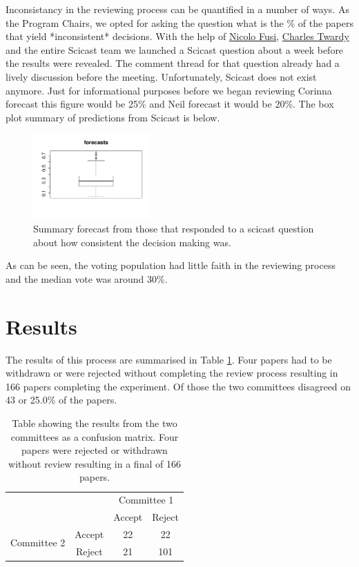 \documentclass[twoside]{article}
\begin{document}
Inconsistancy in the reviewing process can be quantified in a number
of ways. As the Program Chairs, we opted for asking the question what is the
\% of the papers that yield *inconsistent* decisions.
With the help of \href{http://nicolofusi.com/}{Nicolo Fusi},
\href{https://www.linkedin.com/in/ctwardy/}{Charles Twardy} and
the entire Scicast team we launched a
Scicast question about a week before the results were revealed.  The comment
thread for that question already had a lively discussion before the
meeting. Unfortunately, Scicast does not exist anymore. Just for informational
purposes before we began reviewing Corinna forecast this figure would be
25\% and Neil forecast it would be 20\%. The box plot summary of
predictions from Scicast is below.

\begin{figure}[htb]
\begin{center}
\includegraphics[width=0.40\textwidth]{diagrams/neurips/scicast-forecast.png}
\end{center}
\caption{Summary forecast from those that responded to a scicast question about how consistent the decision making was.}
\label{scicast-forecast}
\end{figure}

As can be seen, the voting population had little faith in the
reviewing process and the median vote was around 30\%.

\section{Results}

The results of this process are summarised in Table
\ref{table-neurips-experiment-results}. Four papers had to
be withdrawn or were rejected without completing the review process
resulting in 166 papers completing the experiment. Of those the two committees disagreed
on 43 or 25.0\% of the papers.

\begin{table}[htb]
\caption{Table showing the results from the two committees as a
  confusion matrix. Four papers were rejected or withdrawn without
  review resulting in a final of 166 papers.}
\label{table-neurips-experiment-results}

\begin{tabular}{lc|c|c|}
& & \multicolumn{2}{c}{Committee 1} \\
& & Accept & Reject \\ \hline
\multirow{2}{*}{Committee 2} & Accept & 22 & 22 \\
& Reject & 21 & 101 
\end{tabular}
\end{table}
\end{document}
